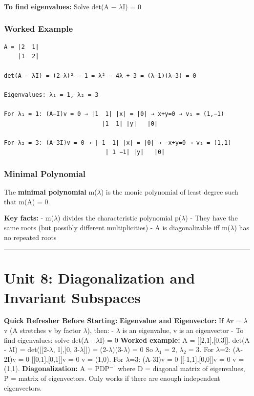 \documentclass[12pt,a4paper,openany]{book}
\begin{document}
{{\textbf{To find eigenvalues:} Solve det(A − $\lambda$I) = 0

\subsubsection{Worked Example}
\begin{verbatim}
A = |2  1|
    |1  2|

det(A − λI) = (2−λ)² − 1 = λ² − 4λ + 3 = (λ−1)(λ−3) = 0

Eigenvalues: λ₁ = 1, λ₂ = 3

For λ₁ = 1: (A−I)v = 0 → |1  1| |x| = |0| → x+y=0 → v₁ = (1,−1)
                            |1  1| |y|   |0|

For λ₂ = 3: (A−3I)v = 0 → |−1  1| |x| = |0| → −x+y=0 → v₂ = (1,1)
                             | 1 −1| |y|   |0|
\end{verbatim}

\subsubsection{Minimal Polynomial}
The \textbf{minimal polynomial} m($\lambda$) is the monic polynomial of least degree such that m(A) = 0.

\begin{tcolorbox}[colback=warningbg!30,colframe=warningborder,title=\textbf{Important -- Exam Alert},breakable,boxrule=1.5pt]
\textbf{Key facts:}
- m($\lambda$) divides the characteristic polynomial p($\lambda$)
- They have the same roots (but possibly different multiplicities)
- A is diagonalizable iff m($\lambda$) has no repeated roots
\end{tcolorbox}

\bigskip\noindent\rule{\textwidth}{0.4pt}\bigskip

\section{Unit 8: Diagonalization and Invariant Subspaces}

\begin{prereqbox}
 \textbf{Quick Refresher Before Starting:}
\textbf{Eigenvalue and Eigenvector:} If Av = $\lambda$v (A stretches v by factor $\lambda$), then:
- $\lambda$ is an eigenvalue, v is an eigenvector
- To find eigenvalues: solve det(A - $\lambda$I) = 0
\textbf{Worked example:} A = [[2,1],[0,3]].
det(A - $\lambda$I) = det([[2-$\lambda$, 1],[0, 3-$\lambda$]]) = (2-$\lambda$)(3-$\lambda$) = 0
So $\lambda_1$ = 2, $\lambda_2$ = 3.
For $\lambda$=2: (A-2I)v = 0  [[0,1],[0,1]]v = 0  v = (1,0).
For $\lambda$=3: (A-3I)v = 0  [[-1,1],[0,0]]v = 0  v = (1,1).
\textbf{Diagonalization:} A = PDP$^{-}^1$ where D = diagonal matrix of eigenvalues, P = matrix of eigenvectors. Only works if there are enough independent eigenvectors.
\end{prereqbox}


}}
\end{document}

